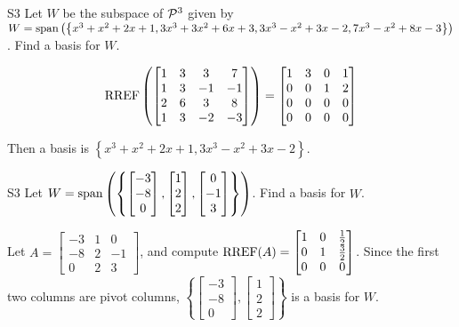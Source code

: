 \begin{problem}{S3}
Let $W$ be the subspace of $\P^3$ given by $W = {\rm span} \left( \left\{ x^3+x^2+2x+1, 3x^3+3x^2+6x+3, 3x^3-x^2+3x-2, 7x^3-x^2+8x-3 \right\} \right)$.  Find a basis for $W$.
\end{problem}
\begin{solution}
$$\RREF\left(\begin{bmatrix} 1 & 3 & 3 & 7 \\ 1 & 3 & -1 & -1 \\ 2 & 6 & 3 & 8 \\ 1 & 3 & -2 & -3 \end{bmatrix}\right) = \begin{bmatrix} 1 & 3 & 0 & 1 \\ 0 & 0 & 1 & 2 \\ 0 & 0 & 0 & 0 \\  0 & 0 & 0 & 0 \end{bmatrix}$$

Then a basis is
$ \left\{ x^3+x^2+2x+1, 3x^3-x^2+3x-2 \right\} $.
\end{solution}


\begin{problem}{S3}
Let $W = {\rm span} \left( \left\{  \begin{bmatrix} -3 \\ -8 \\ 0 \end{bmatrix}, \begin{bmatrix} 1 \\ 2 \\ 2 \end{bmatrix}, \begin{bmatrix} 0 \\ -1 \\ 3 \end{bmatrix} \right\} \right)$.   Find a basis for $W$.
\end{problem}
\begin{solution}
Let $A= \begin{bmatrix}-3 & 1 & 0 \\ -8 & 2 & -1 \\ 0 & 2 & 3\end{bmatrix}$, and compute $\RREF(A) = \begin{bmatrix} 1 & 0 & \frac{1}{2} \\ 0 & 1 & \frac{3}{2} \\ 0 & 0 & 0 \end{bmatrix}$.
Since the first two columns are pivot columns, $\left\{ \begin{bmatrix} -3 \\ -8 \\ 0 \end{bmatrix}, \begin{bmatrix} 1 \\ 2 \\ 2 \end{bmatrix} \right\} $ is a basis for $W$.
\end{solution}


